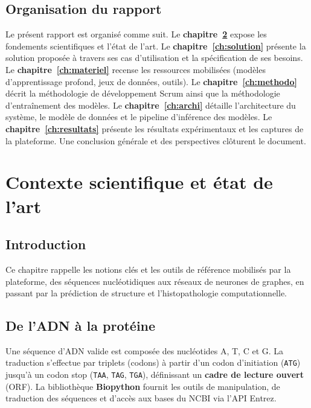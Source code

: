 \documentclass[12pt,a4paper,oneside]{book}
\begin{document}
\section{Organisation du rapport}

Le présent rapport est organisé comme suit. Le \textbf{chapitre~\ref{ch:etat}}
expose les fondements scientifiques et l'état de l'art. Le
\textbf{chapitre~\ref{ch:solution}} présente la solution proposée à travers
ses cas d'utilisation et la spécification de ses besoins. Le
\textbf{chapitre~\ref{ch:materiel}} recense les ressources mobilisées
(modèles d'apprentissage profond, jeux de données, outils). Le
\textbf{chapitre~\ref{ch:methodo}} décrit la méthodologie de développement
Scrum ainsi que la méthodologie d'entraînement des modèles. Le
\textbf{chapitre~\ref{ch:archi}} détaille l'architecture du système, le
modèle de données et le pipeline d'inférence des modèles. Le
\textbf{chapitre~\ref{ch:resultats}} présente les résultats expérimentaux
et les captures de la plateforme. Une conclusion générale et des
perspectives clôturent le document.

\chapter{Contexte scientifique et état de l'art}
\label{ch:etat}

\section*{Introduction}
Ce chapitre rappelle les notions clés et les outils de référence mobilisés
par la plateforme, des séquences nucléotidiques aux réseaux de neurones de
graphes, en passant par la prédiction de structure et l'histopathologie
computationnelle.

\section{De l'ADN à la protéine}

Une séquence d'ADN valide est composée des nucléotides A, T, C et G. La
traduction s'effectue par triplets (codons) à partir d'un codon d'initiation
(\texttt{ATG}) jusqu'à un codon stop (\texttt{TAA}, \texttt{TAG},
\texttt{TGA}), définissant un \textbf{cadre de lecture ouvert} (ORF). La
bibliothèque \textbf{Biopython} \cite{cock2009biopython} fournit les outils
de manipulation, de traduction des séquences et d'accès aux bases du NCBI
via l'API Entrez.
\end{document}
